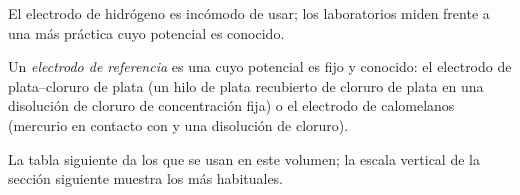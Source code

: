 El electrodo de hidrógeno es incómodo de usar; los laboratorios miden
frente a una  más práctica cuyo potencial es conocido.

\begin{definition}\label{def:b1:nernst:reference-electrode}
Un \emph{electrodo de referencia} es una
 cuyo potencial es fijo y conocido: el electrodo de plata--cloruro
de plata (un hilo de plata recubierto de cloruro de plata en una
disolución de cloruro de concentración fija) o el electrodo de calomelanos
(mercurio en contacto con  y una disolución de cloruro).
\end{definition}

La tabla siguiente da los  que se usan en este
volumen; la escala vertical de la sección siguiente muestra los más
habituales.

